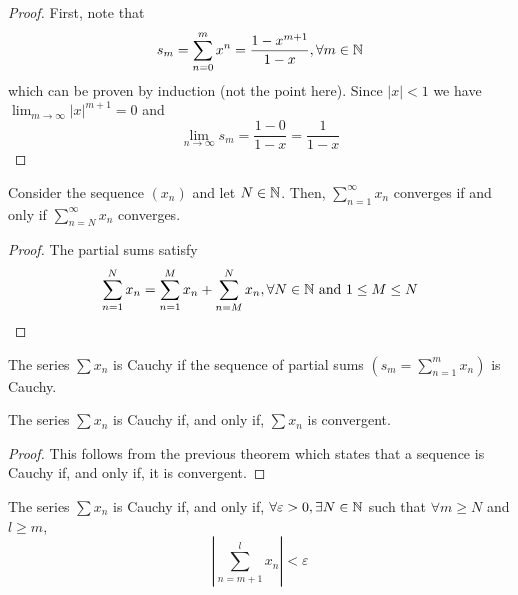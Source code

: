 \begin{proof}
    First, note that
    \begin{equation*}
        s_m = \sum \limits_{n=0}^m x^n = \frac{1-x^{m+1}}{1-x}, \forall m \in \mathbb{N}
    \end{equation*}
    which can be proven by induction (not the point here). Since $|x| < 1$ we have $\lim_{m\to \infty} |x|^{m+1} = 0$ and
    \begin{equation*}
        \lim \limits_{n \to \infty} s_m = \frac{1-0}{1-x} = \frac{1}{1-x}
    \end{equation*}
\end{proof}

\begin{theorem}
    Consider the sequence $(x_n)$ and let $N \in \mathbb{N}$. Then, $\sum_{n=1}^\infty x_n$ converges if and only if $\sum_{n=N}^\infty x_n$ converges.
\end{theorem}

\begin{proof}
    The partial sums satisfy
    \begin{equation*}
        \sum \limits_{n=1}^N x_n = \sum \limits_{n=1}^M x_n + \sum \limits_{n=M}^N x_n, \forall  N \in \mathbb{N} \textnormal{ and } 1 \leq M \leq N
    \end{equation*}
\end{proof}

\begin{definition}
    The series $\sum x_n$ is Cauchy if the sequence of partial sums $(s_m = \sum_{n=1}^m x_n)$ is Cauchy.
\end{definition}

\begin{theorem}
    The series $\sum x_n$ is Cauchy if, and only if, $\sum x_n$ is convergent.
\end{theorem}

\begin{proof}
    This follows from the previous theorem which states that a sequence is Cauchy if, and only if, it is convergent.
\end{proof}

\begin{theorem}
    The series $\sum x_n$ is Cauchy if, and only if, $\forall \varepsilon > 0, \exists N \in \mathbb{N}$ such that $\forall m \geq N$ and $l \geq m$,
    \begin{equation*}
        \left |
            \sum \limits_{n=m+1}^l x_n 
        \right |
        < \varepsilon
    \end{equation*}
\end{theorem}

